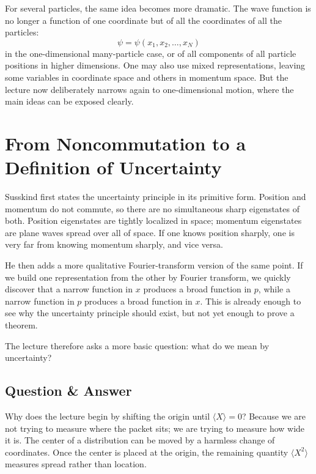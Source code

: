 For several particles, the same idea becomes more dramatic. The wave function is no longer a function of one coordinate but of all the coordinates of all the particles:
\begin{equation}
\psi=\psi(x_1,x_2,\dots,x_N)
\end{equation}
in the one-dimensional many-particle case, or of all components of all particle positions in higher dimensions. One may also use mixed representations, leaving some variables in coordinate space and others in momentum space. But the lecture now deliberately narrows again to one-dimensional motion, where the main ideas can be exposed clearly.

\section{From Noncommutation to a Definition of Uncertainty}

Susskind first states the uncertainty principle in its primitive form. Position and momentum do not commute, so there are no simultaneous sharp eigenstates of both. Position eigenstates are tightly localized in space; momentum eigenstates are plane waves spread over all of space. If one knows position sharply, one is very far from knowing momentum sharply, and vice versa.

He then adds a more qualitative Fourier-transform version of the same point. If we build one representation from the other by Fourier transform, we quickly discover that a narrow function in \(x\) produces a broad function in \(p\), while a narrow function in \(p\) produces a broad function in \(x\). This is already enough to see why the uncertainty principle should exist, but not yet enough to prove a theorem.

The lecture therefore asks a more basic question: what do we mean by uncertainty?

\subsection{Question \& Answer}

Why does the lecture begin by shifting the origin until \(\langle X\rangle=0\)? Because we are not trying to measure where the packet sits; we are trying to measure how wide it is. The center of a distribution can be moved by a harmless change of coordinates. Once the center is placed at the origin, the remaining quantity \(\langle X^2\rangle\) measures spread rather than location.

